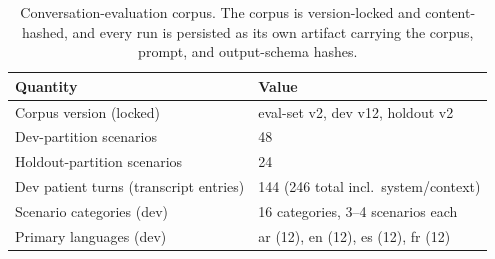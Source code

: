 \begin{table}[htbp]
  \centering
  \small
  \caption{Conversation-evaluation corpus. The corpus is version-locked and content-hashed, and every run is persisted as its own artifact carrying the corpus, prompt, and output-schema hashes.}
  \label{tab:conv-eval-summary}
  \begin{tabular}{ll}
    \toprule
    Quantity & Value \\
    \midrule
    Corpus version (locked) & eval-set v2, dev v12, holdout v2 \\
    Dev-partition scenarios & 48 \\
    Holdout-partition scenarios & 24 \\
    Dev patient turns (transcript entries) & 144 (246 total incl.\ system/context) \\
    Scenario categories (dev) & 16 categories, 3--4 scenarios each \\
    Primary languages (dev) & ar (12), en (12), es (12), fr (12) \\
    \bottomrule
  \end{tabular}
\end{table}
